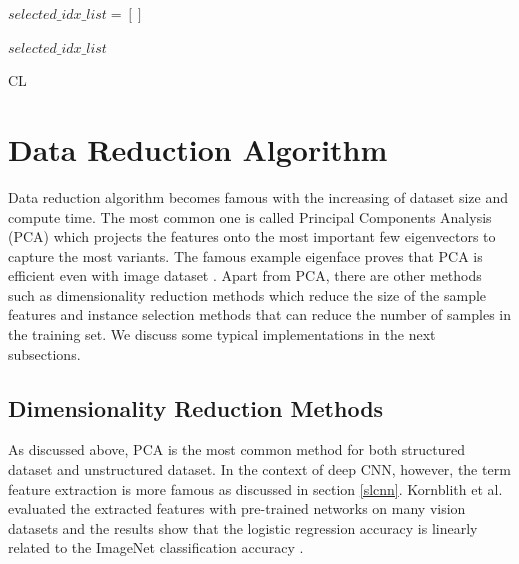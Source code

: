 \begin{algorithm}[H]

$selected\_idx\_list = []$ \;



\Return $selected\_idx\_list$ \;

\caption{CL}
\end{algorithm}

\section{Data Reduction Algorithm}
Data reduction algorithm becomes famous with the increasing of dataset size and compute time. The most common one is called Principal Components Analysis (PCA) which projects the features onto the most important few eigenvectors to capture the most variants. The famous example eigenface proves that PCA is efficient even with image dataset \cite{Paul2012}. Apart from PCA, there are other methods such as dimensionality reduction methods which reduce the size of the sample features and instance selection methods that can reduce the number of samples in the training set. We discuss some typical implementations in the next subsections.

\subsection{Dimensionality Reduction Methods}
As discussed above, PCA is the most common method for both structured dataset and unstructured dataset. In the context of deep CNN, however, the term feature extraction is more famous as discussed in section \ref{slcnn}. Kornblith et al. evaluated the extracted features with pre-trained networks on many vision datasets and the results show that the logistic regression accuracy is linearly related to the ImageNet classification accuracy \cite{Kornblith2018}. 

